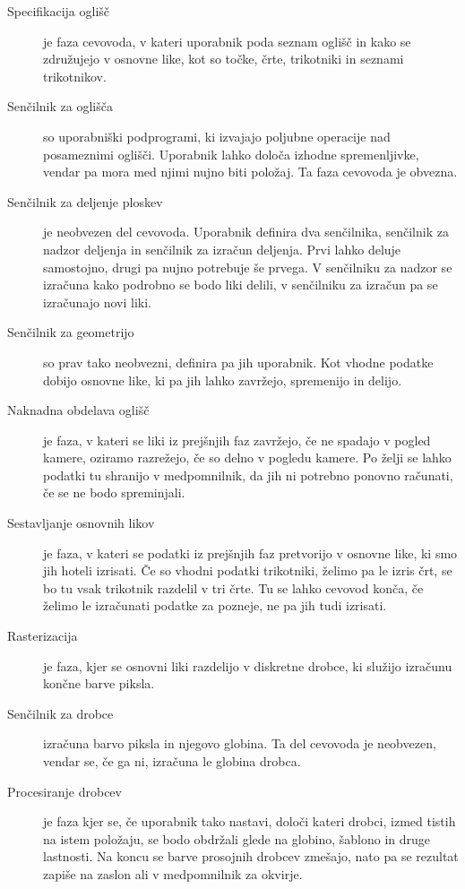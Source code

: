 \documentclass[a4paper, 12pt]{book}
\begin{document}
\begin{description}
\item [Specifikacija oglišč] je faza cevovoda, v kateri uporabnik poda seznam oglišč in kako se združujejo v osnovne like, kot so točke, črte, trikotniki in seznami trikotnikov.

\item [Senčilnik za oglišča] so uporabniški podprogrami, ki izvajajo poljubne operacije nad posameznimi oglišči. Uporabnik lahko določa izhodne spremenljivke, vendar pa mora med njimi nujno biti položaj. Ta faza cevovoda je obvezna.

\item [Senčilnik za deljenje ploskev] je neobvezen del cevovoda. Uporabnik definira dva senčilnika, senčilnik za nadzor deljenja in senčilnik za izračun deljenja. Prvi lahko deluje samostojno, drugi pa nujno potrebuje še prvega. V senčilniku za nadzor se izračuna kako podrobno se bodo liki delili, v senčilniku za izračun pa se izračunajo novi liki.

\item [Senčilnik za geometrijo] so prav tako neobvezni, definira pa jih uporabnik. Kot vhodne podatke dobijo osnovne like, ki pa jih lahko zavržejo, spremenijo in delijo.

\item [Naknadna obdelava oglišč] je faza, v kateri se liki iz prejšnjih faz zavržejo, če ne spadajo v pogled kamere, oziramo razrežejo, če so delno v pogledu kamere. Po želji se lahko podatki tu shranijo v medpomnilnik, da jih ni potrebno ponovno računati, če se ne bodo spreminjali.

\item [Sestavljanje osnovnih likov] je faza, v kateri se podatki iz prejšnjih faz pretvorijo v osnovne like, ki smo jih hoteli izrisati. Če so vhodni podatki trikotniki, želimo pa le izris črt, se bo tu vsak trikotnik razdelil v tri črte. Tu se lahko cevovod konča, če želimo le izračunati podatke za pozneje, ne pa jih tudi izrisati. 

\item [Rasterizacija] je faza, kjer se osnovni liki razdelijo v diskretne drobce, ki služijo izračunu končne barve piksla.

\item [Senčilnik za drobce] izračuna barvo piksla in njegovo globina. Ta del cevovoda je neobvezen, vendar se, če ga ni, izračuna le globina drobca.

\item [Procesiranje drobcev] je faza kjer se, če uporabnik tako nastavi, določi kateri drobci, izmed tistih na istem položaju, se bodo obdržali glede na globino, šablono in druge lastnosti. Na koncu se barve prosojnih drobcev zmešajo, nato pa se rezultat zapiše na zaslon ali v medpomnilnik za okvirje.
\end{description}
\end{document}
